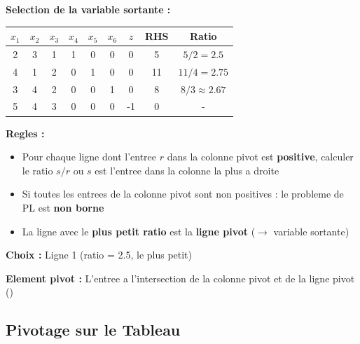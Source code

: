 \documentclass[12pt,a4paper]{article}
\newcommand*\circled[1]{\tikz[baseline=(char.base)]{\node[shape=circle,draw,inner sep=2pt] (char) {#1};}}
\begin{document}
\begin{methode}
\textbf{Selection de la variable sortante :}

\begin{center}
\begin{tabular}{ccccccc|c|c}
\toprule
$x_1$ & $x_2$ & $x_3$ & $x_4$ & $x_5$ & $x_6$ & $z$ & RHS & Ratio \\
\midrule
\textcolor{defvert}{2} & 3 & 1 & 1 & 0 & 0 & 0 & 5 & $5/2 = 2.5$ \\
\textcolor{defvert}{4} & 1 & 2 & 0 & 1 & 0 & 0 & 11 & $11/4 = 2.75$ \\
\textcolor{defvert}{3} & 4 & 2 & 0 & 0 & 1 & 0 & 8 & $8/3 \approx 2.67$ \\
\midrule
5 & 4 & 3 & 0 & 0 & 0 & -1 & 0 & - \\
\bottomrule
\end{tabular}
\end{center}

\textbf{Regles :}
\begin{itemize}
    \item Pour chaque ligne dont l'entree $r$ dans la colonne pivot est \textcolor{titrebleu}{\textbf{positive}}, calculer le ratio $s/r$ ou $s$ est l'entree dans la colonne la plus a droite
    \item Si toutes les entrees de la colonne pivot sont non positives : le probleme de PL est \textcolor{importantrouge}{\textbf{non borne}}
    \item La ligne avec le \textcolor{defvert}{\textbf{plus petit ratio}} est la \textcolor{importantrouge}{\textbf{ligne pivot}} ($\to$ variable sortante)
\end{itemize}

\textbf{Choix :} Ligne 1 (ratio = 2.5, le plus petit)

\textbf{Element pivot :} L'entree a l'intersection de la colonne pivot et de la ligne pivot (\circled{2})
\end{methode}

\newpage
\subsection{Pivotage sur le Tableau}
\end{document}
